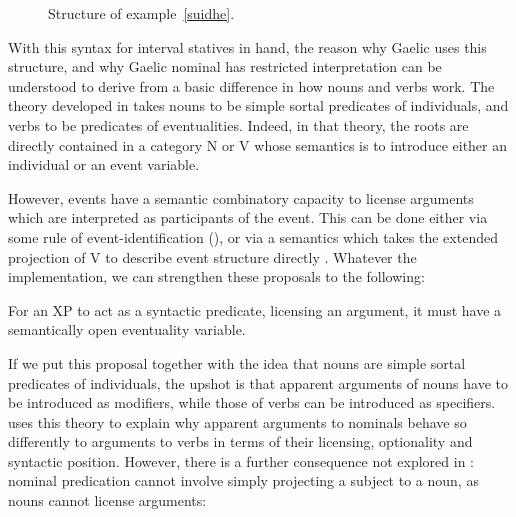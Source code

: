 \documentclass[output=paper]{langsci/langscibook}
\begin{document}
\begin{figure}
\caption{Structure of example~\eqref{suidhe}.\label{suidhetree}}
\end{figure}

With this syntax for interval statives in hand, the reason why Gaelic uses this\largerpage
structure, and why Gaelic nominal  has restricted interpretation can
be understood to derive from a basic difference in how nouns and verbs work.
The theory developed in \citet{adgerbook} takes nouns to be simple sortal
predicates of individuals, and verbs to be predicates of eventualities. Indeed,
in that theory, the roots are directly contained in a category N or V whose
semantics is to introduce either an individual or an event variable.

{\sloppy
However, events have a semantic combinatory capacity to license arguments which
are interpreted as participants of the event. This can be done either via some
rule of event-identification (\citealt{kratzer96}), or via a semantics which
takes the extended projection of V to describe event structure
directly \parencite{ramchand08}. Whatever the implementation, we can strengthen
these proposals to the following:}

\ea For an XP to act as a syntactic predicate, licensing an argument, it must
have a semantically open eventuality variable. \z

If we put this proposal together with the idea that nouns are simple sortal
predicates of individuals, the upshot is that apparent arguments of nouns have
to be introduced as modifiers, while those of verbs can be introduced as
specifiers. \textcite{adgerbook} uses this theory to explain why apparent
arguments to nominals behave so differently to arguments to verbs in terms of
their licensing, optionality and syntactic position. However, there is a
further consequence not explored in \citet{adgerbook}: nominal predication
cannot involve simply projecting a subject to a noun, as nouns cannot license
arguments:
\end{document}
